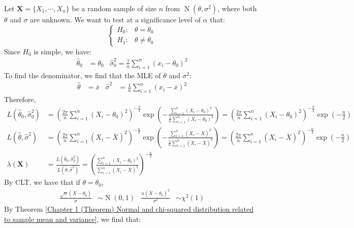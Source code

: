 \documentclass{huhtakm-template-book-v2}
\DeclareMathOperator{\N}{N}
\begin{document}
\newpage
\begin{eg}
	Let $\mathbf{X}=\{X_{1},\cdots,X_{n}\}$ be a random sample of size $n$ from $\N(\theta,\sigma^{2})$, where both $\theta$ and $\sigma$ are unknown. We want to test at a significance level of $\alpha$ that:
	\begin{equation*}
		\begin{cases}
			H_{0}: &\theta=\theta_{0}\\
			H_{1}: &\theta\neq\theta_{0}
		\end{cases}
	\end{equation*}
	Since $H_{0}$ is simple, we have:
	\begin{align*}
		\hat{\theta}_{0}&=\theta_{0} & \hat{\sigma}_{0}^{2}=\frac{1}{n}\sum_{i=1}^{n}(x_{i}-\theta_{0})^{2}
	\end{align*}
	To find the denominator, we find that the MLE of $\theta$ and $\sigma^{2}$:
	\begin{align*}
		\hat{\theta}&=\overline{x} & \hat{\sigma}^{2}&=\frac{1}{n}\sum_{i=1}^{n}(x_{i}-\overline{x})^{2}
	\end{align*}
	Therefore,
	\begin{align*}
		L(\hat{\theta}_{0},\hat{\sigma}_{0}^{2})&=\left(\frac{2\pi}{n}\sum_{i=1}^{n}(X_{i}-\theta_{0})^{2}\right)^{-\frac{n}{2}}\exp\left(-\frac{\sum_{i=1}^{n}(X_{i}-\theta_{0})^{2}}{\frac{2}{n}\sum_{i=1}^{n}(X_{i}-\theta_{0})^{2}}\right)=\left(\frac{2\pi}{n}\sum_{i=1}^{n}(X_{i}-\theta_{0})^{2}\right)^{-\frac{n}{2}}\exp\left(-\frac{n}{2}\right)\\
		L(\hat{\theta},\hat{\sigma}^{2})&=\left(\frac{2\pi}{n}\sum_{i=1}^{n}(X_{i}-\overline{X})^{2}\right)^{-\frac{n}{2}}\exp\left(-\frac{\sum_{i=1}^{n}(X_{i}-\overline{X})^{2}}{\frac{2}{n}\sum_{i=1}^{n}(X_{i}-\overline{X})^{2}}\right)=\left(\frac{2\pi}{n}\sum_{i=1}^{n}(X_{i}-\overline{X})^{2}\right)^{-\frac{n}{2}}\exp\left(-\frac{n}{2}\right)\\
		\lambda(\mathbf{X})&=\frac{L(\hat{\theta}_{0},\hat{\sigma}_{0}^{2})}{L(\hat{\theta},\hat{\sigma}^{2})}=\left(\frac{\sum_{i=1}^{n}(X_{i}-\theta_{0})^{2}}{\sum_{i=1}^{n}(X_{i}-\overline{X})^{2}}\right)^{-\frac{n}{2}}
	\end{align*}
	By CLT, we have that if $\theta=\theta_{0}$,
	\begin{align*}
		\frac{\sqrt{n}(\overline{X}-\theta_{0})}{\sigma}&\sim\N(0,1) & \frac{n(\overline{X}-\theta_{0})^{2}}{\sigma^{2}}&\sim\chi^{2}(1)
	\end{align*}
	By Theorem \ref{Chapter 1 (Theorem) Normal and chi-squared distribution related to sample mean and variance}, we find that:

\end{eg}
\end{document}
